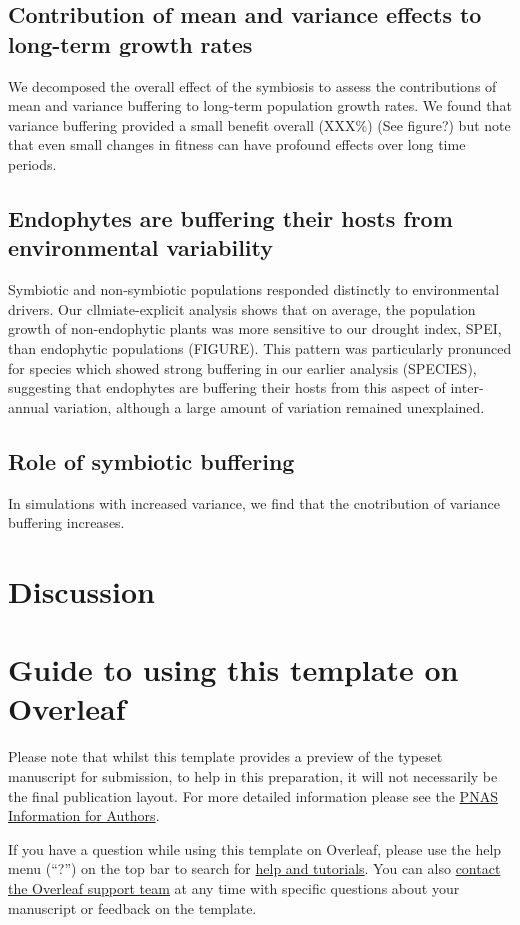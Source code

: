 \documentclass[9pt,twocolumn,twoside,lineno]{pnas-new}
\begin{document}
\subsection*{Contribution of mean and variance effects to long-term growth rates}
We decomposed the overall effect of the symbiosis to assess the contributions of mean and variance buffering to long-term population growth rates. We found that variance buffering provided a small benefit overall (XXX\%) (See figure?) but note that even small changes in fitness can have profound effects over long time periods.
\subsection*{Endophytes are buffering their hosts from environmental variability}
Symbiotic and non-symbiotic populations responded distinctly to environmental drivers. Our cllmiate-explicit analysis shows that on average, the population growth of non-endophytic plants was more sensitive to our drought index, SPEI, than endophytic populations (FIGURE). This pattern was particularly pronunced for species which showed strong buffering in our earlier analysis (SPECIES), suggesting that endophytes are buffering their hosts from this aspect of inter-annual variation, although a large amount of variation remained unexplained.
\subsection*{Role of symbiotic buffering }
In simulations with increased variance, we find that the cnotribution of variance buffering increases.


\section*{Discussion}

\section*{Guide to using this template on Overleaf}

Please note that whilst this template provides a preview of the typeset manuscript for submission, to help in this preparation, it will not necessarily be the final publication layout. For more detailed information please see the \href{http://www.pnas.org/site/authors/format.xhtml}{PNAS Information for Authors}.

If you have a question while using this template on Overleaf, please use the help menu (``?'') on the top bar to search for \href{https://www.overleaf.com/help}{help and tutorials}. You can also \href{https://www.overleaf.com/contact}{contact the Overleaf support team} at any time with specific questions about your manuscript or feedback on the template.
\end{document}

